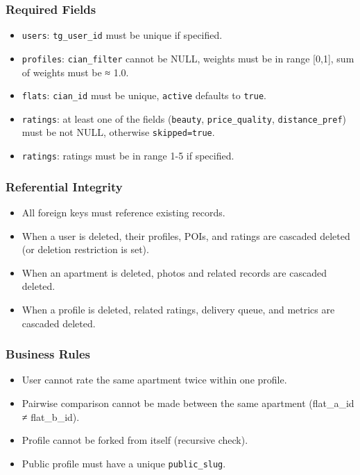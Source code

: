 \documentclass[12pt,a4paper]{article}
\begin{document}
\subsubsection{Required Fields}
\begin{itemize}
    \item \texttt{users}: \texttt{tg\_user\_id} must be unique if specified.
    \item \texttt{profiles}: \texttt{cian\_filter} cannot be NULL, weights must be in range [0,1], sum of weights must be ≈ 1.0.
    \item \texttt{flats}: \texttt{cian\_id} must be unique, \texttt{active} defaults to \texttt{true}.
    \item \texttt{ratings}: at least one of the fields (\texttt{beauty}, \texttt{price\_quality}, \texttt{distance\_pref}) must be not NULL, otherwise \texttt{skipped=true}.
    \item \texttt{ratings}: ratings must be in range 1-5 if specified.
\end{itemize}

\subsubsection{Referential Integrity}
\begin{itemize}
    \item All foreign keys must reference existing records.
    \item When a user is deleted, their profiles, POIs, and ratings are cascaded deleted (or deletion restriction is set).
    \item When an apartment is deleted, photos and related records are cascaded deleted.
    \item When a profile is deleted, related ratings, delivery queue, and metrics are cascaded deleted.
\end{itemize}

\subsubsection{Business Rules}
\begin{itemize}
    \item User cannot rate the same apartment twice within one profile.
    \item Pairwise comparison cannot be made between the same apartment (flat\_a\_id ≠ flat\_b\_id).
    \item Profile cannot be forked from itself (recursive check).
    \item Public profile must have a unique \texttt{public\_slug}.
\end{itemize}
\end{document}
